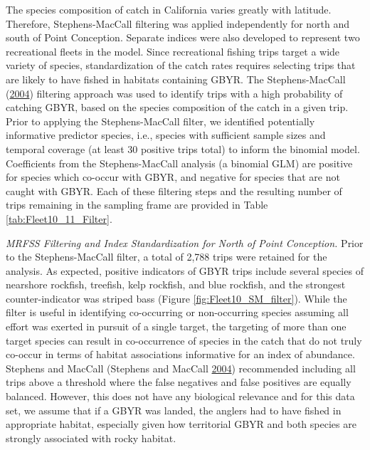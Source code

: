 \documentclass[12pt,]{article}
\begin{document}
The species composition of catch in California varies greatly with
latitude.\\
Therefore, Stephens-MacCall filtering was applied independently for
north and south of Point Conception. Separate indices were also
developed to represent two recreational fleets in the model. Since
recreational fishing trips target a wide variety of species,
standardization of the catch rates requires selecting trips that are
likely to have fished in habitats containing GBYR. The Stephens-MacCall
(\protect\hyperlink{ref-Stephens2004}{2004}) filtering approach was used
to identify trips with a high probability of catching GBYR, based on the
species composition of the catch in a given trip. Prior to applying the
Stephens-MacCall filter, we identified potentially informative predictor
species, i.e., species with sufficient sample sizes and temporal
coverage (at least 30 positive trips total) to inform the binomial
model. Coefficients from the Stephens-MacCall analysis (a binomial GLM)
are positive for species which co-occur with GBYR, and negative for
species that are not caught with GBYR. Each of these filtering steps and
the resulting number of trips remaining in the sampling frame are
provided in Table \ref{tab:Fleet10_11_Filter}.

\emph{MRFSS Filtering and Index Standardization for North of Point
Conception.} Prior to the Stephens-MacCall filter, a total of 2,788
trips were retained for the analysis. As expected, positive indicators
of GBYR trips include several species of nearshore rockfish, treefish,
kelp rockfish, and blue rockfish, and the strongest counter-indicator
was striped bass (Figure \ref{fig:Fleet10_SM_filter}). While the filter
is useful in identifying co-occurring or non-occurring species assuming
all effort was exerted in pursuit of a single target, the targeting of
more than one target species can result in co-occurrence of species in
the catch that do not truly co-occur in terms of habitat associations
informative for an index of abundance. Stephens and MacCall (Stephens
and MacCall \protect\hyperlink{ref-Stephens2004}{2004}) recommended
including all trips above a threshold where the false negatives and
false positives are equally balanced. However, this does not have any
biological relevance and for this data set, we assume that if a GBYR was
landed, the anglers had to have fished in appropriate habitat,
especially given how territorial GBYR and both species are strongly
associated with rocky habitat.
\end{document}
